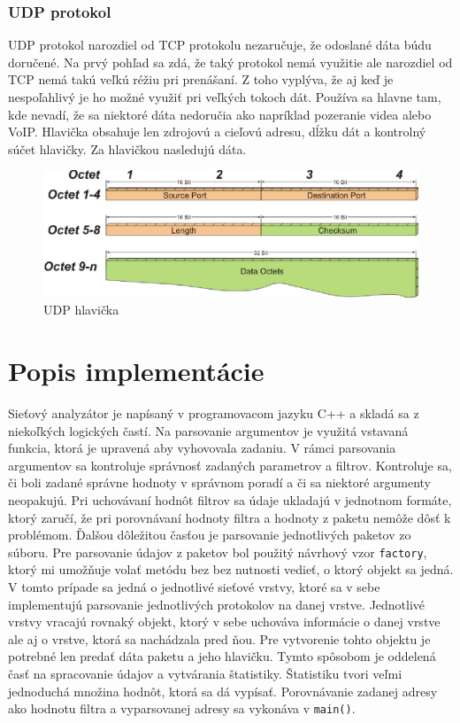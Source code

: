 \documentclass[10pt,a4paper,final]{article}
\begin{document}
\subsubsection{UDP protokol}
UDP protokol narozdiel od TCP protokolu nezaručuje, že odoslané dáta búdu doručené. Na prvý pohľad sa zdá, že taký protokol nemá využitie ale narozdiel od TCP nemá takú veľkú réžiu pri prenášaní. Z toho vyplýva, že aj keď je nespoľahlivý je ho možné využiť pri veľkých tokoch dát. Používa sa hlavne tam, kde nevadí, že sa niektoré dáta nedoručia ako napríklad pozeranie videa alebo VoIP. Hlavička obsahuje len zdrojovú a cieľovú adresu, dĺžku dát a kontrolný súčet hlavičky. Za hlavičkou nasledujú dáta.
\begin{figure}[H]
	\centering
	\includegraphics[scale=0.63, keepaspectratio]{images/udp.eps}
	\caption{UDP hlavička\cite{udpprotocol}}
\end{figure}


\section{Popis implementácie}

\noindent Sieťový analyzátor je napísaný v programovacom jazyku C++ a skladá sa z niekoľkých logických častí. Na parsovanie argumentov je využitá vstavaná funkcia, ktorá je upravená aby vyhovovala zadaniu. V rámci parsovania argumentov sa kontroluje správnosť zadaných parametrov a filtrov. Kontroluje sa, či boli zadané správne hodnoty v správnom poradí a či sa niektoré argumenty neopakujú. Pri uchovávaní hodnôt filtrov sa údaje ukladajú v jednotnom formáte, ktorý zaručí, že pri porovnávaní hodnoty filtra a hodnoty z paketu nemôže dôsť k problémom. Ďalšou dôležitou časťou je parsovanie jednotlivých paketov zo súboru. Pre parsovanie údajov z paketov bol použitý návrhový vzor \texttt{factory}, ktorý mi umožňuje volať metódu bez bez nutnosti vedieť, o ktorý objekt sa jedná. V tomto prípade sa jedná o jednotlivé sieťové vrstvy, ktoré sa v sebe implementujú parsovanie jednotlivých protokolov na danej vrstve. Jednotlivé vrstvy vracajú rovnaký objekt, ktorý v sebe uchováva informácie o danej vrstve ale aj o vrstve, ktorá sa nachádzala pred ňou. Pre vytvorenie tohto objektu je potrebné len predať dáta paketu a jeho hlavičku. Tymto spôsobom je oddelená časť na spracovanie údajov a vytvárania štatistiky. Štatistiku tvori veľmi jednoduchá množina hodnôt, ktorá sa dá vypísať. Porovnávanie zadanej adresy ako hodnotu filtra a vyparsovanej adresy sa vykonáva v \texttt{main()}.
\end{document}

